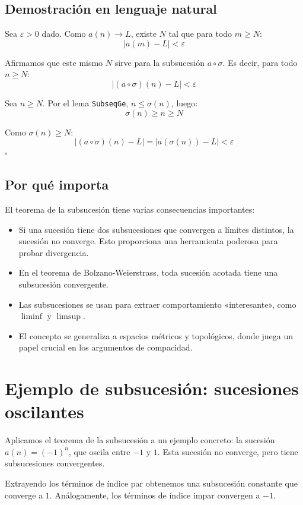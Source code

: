 \subsection{Demostración en lenguaje natural}

  Sea $\varepsilon>0$ dado. Como $a(n)\to L$, existe $N$ tal que para todo
  $m\geq N$:
  \[
    |a(m)-L| < \varepsilon
  \]

  Afirmamos que este mismo $N$ sirve para la subsucesión $a\circ\sigma$. Es
  decir, para todo $n\geq N$:
  \[
    |(a\circ\sigma)(n)-L| < \varepsilon
  \]

  Sea $n\geq N$. Por el lema \texttt{SubseqGe}, $n\leq\sigma(n)$, luego:
  \[
    \sigma(n)\geq n\geq N
  \]

  Como $\sigma(n)\geq N$:
  \[
    |(a\circ\sigma)(n)-L| = |a(\sigma(n))-L| < \varepsilon
  \]
  \hfill$\square$

\subsection{Por qué importa}

El teorema de la subsucesión tiene varias consecuencias importantes:
\begin{itemize}
  \item Si una sucesión tiene dos subsucesiones que convergen a límites
        distintos, la sucesión no converge. Esto proporciona una herramienta
        poderosa para probar divergencia.
  \item En el teorema de Bolzano-Weierstrass, toda sucesión acotada tiene
        una subsucesión convergente.
  \item Las subsucesiones se usan para extraer comportamiento «interesante»,
        como $\liminf$ y $\limsup$.
  \item El concepto se generaliza a espacios métricos y topológicos, donde
        juega un papel crucial en los argumentos de compacidad.
\end{itemize}

\section{Ejemplo de subsucesión: sucesiones oscilantes}

Aplicamos el teorema de la subsucesión a un ejemplo concreto: la sucesión
$a(n)=(-1)^n$, que oscila entre $-1$ y $1$. Esta sucesión no converge, pero
tiene subsucesiones convergentes.

Extrayendo los términos de índice par obtenemos una subsucesión constante que
converge a $1$. Análogamente, los términos de índice impar convergen a $-1$.


